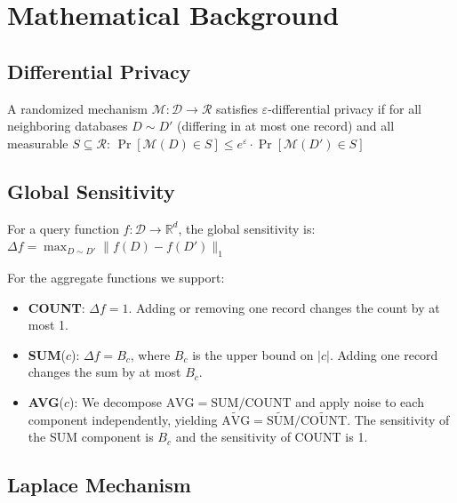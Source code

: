 \documentclass[sigconf,nonacm]{acmart}
\begin{document}
\section{Mathematical Background}
\label{sec:math}

\subsection{Differential Privacy}

\begin{definition}
A randomized mechanism $\mathcal{M}: \mathcal{D} \rightarrow \mathcal{R}$ satisfies $\varepsilon$-differential privacy if for all neighboring databases $D \sim D'$ (differing in at most one record) and all measurable $S \subseteq \mathcal{R}$:
$\Pr[\mathcal{M}(D) \in S] \leq e^{\varepsilon} \cdot \Pr[\mathcal{M}(D') \in S]$
\end{definition}

\subsection{Global Sensitivity}

\begin{definition}
For a query function $f: \mathcal{D} \rightarrow \mathbb{R}^d$, the global sensitivity is:
$\Delta f = \max_{D \sim D'} \| f(D) - f(D') \|_1$
\end{definition}

For the aggregate functions we support:
\begin{itemize}
    \item \textbf{COUNT}: $\Delta f = 1$. Adding or removing one record changes the count by at most 1.
    \item \textbf{SUM}($c$): $\Delta f = B_c$, where $B_c$ is the upper bound on $|c|$. Adding one record changes the sum by at most $B_c$.
    \item \textbf{AVG}($c$): We decompose $\text{AVG} = \text{SUM}/\text{COUNT}$ and apply noise to each component independently, yielding $\widetilde{\text{AVG}} = \widetilde{\text{SUM}} / \widetilde{\text{COUNT}}$. The sensitivity of the SUM component is $B_c$ and the sensitivity of COUNT is 1.
\end{itemize}

\subsection{Laplace Mechanism}
\end{document}
